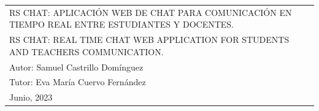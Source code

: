 \begin{table}[ht]
\begin{tabular}{p{1\linewidth}}
		\LARGE{\uppercase{RS Chat: Aplicación web de chat para comunicación en tiempo real entre estudiantes y docentes.}}
		\\[5ex]

		\LARGE{\uppercase{RS Chat: Real time chat web application for students and teachers communication.}}
		\\[8ex]

		\hfill\large{Autor: Samuel Castrillo Domínguez}
		\\[3pt]
		\hfill\large{Tutor: Eva María Cuervo Fernández}
		\\[5ex]

		\huge{Junio, 2023}
	\end{tabular}
\end{table}
